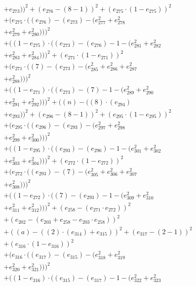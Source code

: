 \documentclass[10pt, a4paper]{article}
\begin{document}
\begin{small}
\begin{align*}
& + e_{273}))^{2} + (e_{276} - (8 - 1))^{2} + (e_{275}  \cdot  (1 - e_{275}))^{2} \\
& + (e_{275}  \cdot  ((e_{276}) - (e_{273}) - (e_{277}^{2} + e_{278}^{2} \\
& + e_{279}^{2} + e_{280}^{2})))^{2} \\
& + ((1 - e_{275})  \cdot  ((e_{273}) - (e_{276}) - 1 - (e_{281}^{2} + e_{282}^{2} \\
& + e_{283}^{2} + e_{284}^{2})))^{2} + (e_{271}  \cdot  (1 - e_{271}))^{2} \\
& + (e_{271}  \cdot  ((7) - (e_{273}) - (e_{285}^{2} + e_{286}^{2} + e_{287}^{2} \\
& + e_{288}^{2})))^{2} \\
& + ((1 - e_{271})  \cdot  ((e_{273}) - (7) - 1 - (e_{289}^{2} + e_{290}^{2} \\
& + e_{291}^{2} + e_{292}^{2})))^{2} + ((n) - ((8)  \cdot  (e_{294}) \\
& + e_{293}))^{2} + (e_{296} - (8 - 1))^{2} + (e_{295}  \cdot  (1 - e_{295}))^{2} \\
& + (e_{295}  \cdot  ((e_{296}) - (e_{293}) - (e_{297}^{2} + e_{298}^{2} \\
& + e_{299}^{2} + e_{300}^{2})))^{2} \\
& + ((1 - e_{295})  \cdot  ((e_{293}) - (e_{296}) - 1 - (e_{301}^{2} + e_{302}^{2} \\
& + e_{303}^{2} + e_{304}^{2})))^{2} + (e_{272}  \cdot  (1 - e_{272}))^{2} \\
& + (e_{272}  \cdot  ((e_{293}) - (7) - (e_{305}^{2} + e_{306}^{2} + e_{307}^{2} \\
& + e_{308}^{2})))^{2} \\
& + ((1 - e_{272})  \cdot  ((7) - (e_{293}) - 1 - (e_{309}^{2} + e_{310}^{2} \\
& + e_{311}^{2} + e_{312}^{2})))^{2} + (e_{258} - (e_{271}  \cdot  e_{272}))^{2} \\
& + (e_{202} - (e_{203} + e_{258} - e_{203}  \cdot  e_{258}))^{2} \\
& + ((a) - ((2)  \cdot  (e_{314}) + e_{315}))^{2} + (e_{317} - (2 - 1))^{2} \\
& + (e_{316}  \cdot  (1 - e_{316}))^{2} \\
& + (e_{316}  \cdot  ((e_{317}) - (e_{315}) - (e_{318}^{2} + e_{319}^{2} \\
& + e_{320}^{2} + e_{321}^{2})))^{2} \\
& + ((1 - e_{316})  \cdot  ((e_{315}) - (e_{317}) - 1 - (e_{322}^{2} + e_{323}^{2} \\

\end{align*}
\end{small}
\end{document}
